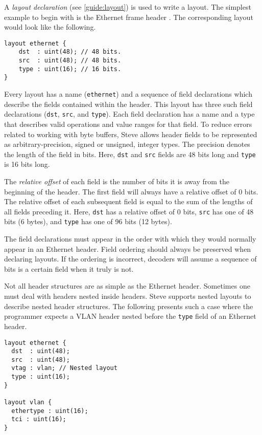 A \emph{layout declaration} (see \ref{guide:layout}) is used to write a layout.
The simplest example to begin with is the Ethernet frame header \cite{eth_std}.
The corresponding layout would look like the following.  

\begin{codepage}
\begin{lstlisting}
layout ethernet {
	dst  : uint(48); // 48 bits.
	src  : uint(48); // 48 bits.
	type : uint(16); // 16 bits.
}
\end{lstlisting}
\end{codepage}

Every layout has a name (\texttt{ethernet}) and a sequence of field declarations
which describe the fields contained within the header.
This layout has three such field declarations (\texttt{dst}, \texttt{src},
and \texttt{type}).
Each field declaration has a name and a type that describes valid operations and
value ranges for that field.
To reduce errors related to working with byte buffers, Steve allows header fields to
be represented as arbitrary-precision, signed or unsigned, integer types.
The precision denotes the length of the field in bits.
Here, \texttt{dst} and \texttt{src} fields are 48 bits long and \texttt{type} is
16 bits long.

The \textit{relative offset} of each field is the number of bits it is away
from the beginning of the header. The first field will always have a relative
offset of 0 bits. The relative offset of each subsequent field is equal to the
sum of the lengths of all fields preceding it. Here, \texttt{dst} has a relative
offset of 0 bits, \texttt{src} has one of 48 bits (6 bytes), and \texttt{type} has one of
96 bits (12 bytes).

The field declarations must appear in the order with which they would normally appear
in an Ethernet header. Field ordering should always be
preserved when declaring layouts. If the ordering is incorrect, decoders will
assume a sequence of bits is a certain field when it truly is not. 

Not all header structures are as simple as the Ethernet header. Sometimes one
must deal with headers nested inside headers. Steve supports nested layouts
to describe nested header structures.
The following presents such a case where the programmer expects a VLAN header
\cite{vlan_std} nested before the \texttt{type} field of an Ethernet
header.

\begin{codepage}
\begin{lstlisting}
layout ethernet {
  dst  : uint(48);
  src  : uint(48);
  vtag : vlan; // Nested layout
  type : uint(16);
}

layout vlan {
  ethertype : uint(16);
  tci : uint(16);
}
\end{lstlisting}
\end{codepage}

